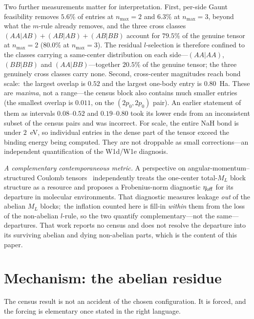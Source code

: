 \documentclass[aps,pra,twocolumn,superscriptaddress,longbibliography]{revtex4-2}
\begin{document}
Two further measurements matter for interpretation.  First, per-side
Gaunt feasibility removes $5.6\%$ of entries at $n_{\max} = 2$ and
$6.3\%$ at $n_{\max} = 3$, beyond what the $m$-rule already removes, and the three cross classes
$(AA|AB) + (AB|AB) + (AB|BB)$ account for $79.5\%$ of the genuine tensor at $n_{\max}=2$ ($80.0\%$ at $n_{\max}=3$).
The residual $l$-selection is therefore confined to the classes carrying a
same-center distribution on each side---$(AA|AA)$, $(BB|BB)$ and
$(AA|BB)$---together $20.5\%$ of the genuine tensor; the three genuinely
cross classes carry none.  Second, cross-center magnitudes reach bond
scale:\ the largest overlap is $0.52$ and the largest one-body entry is
$0.80$~Ha.  These are \emph{maxima}, not a range---the census block also
contains much smaller entries (the smallest overlap is $0.011$, on the
$(2p_{0}, 2p_{0})$ pair).  An earlier statement of them as intervals
$0.08$--$0.52$ and $0.19$--$0.80$ took its lower ends from an inconsistent
subset of the census pairs and was incorrect.  For
scale, the entire NaH bond is under $2$~eV, so individual entries in the
dense part of the tensor exceed the binding energy being computed.  They
are not droppable as small corrections---an independent quantification of
the W1d/W1e diagnosis.

\emph{A complementary contemporaneous metric.}  A perspective on
angular-momentum--structured Coulomb tensors~\cite{peng2026} independently
treats the one-center total-$M_L$ block structure as a resource and proposes
a Frobenius-norm diagnostic $\eta_{\rm off}$ for its departure in molecular
environments.  That diagnostic measures leakage \emph{out} of the abelian
$M_L$ blocks;\ the inflation counted here is fill-in \emph{within} them from
the loss of the non-abelian $l$-rule, so the two quantify complementary---not
the same---departures.  That work reports no census and does not resolve the
departure into its surviving abelian and dying non-abelian parts, which is
the content of this paper.

\section{Mechanism: the abelian residue}
\label{sec:mechanism}

The census result is not an accident of the chosen configuration.  It is
forced, and the forcing is elementary once stated in the right language.
\end{document}
